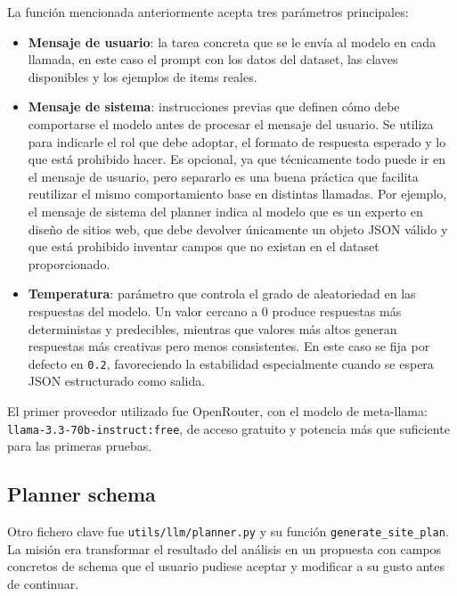 La función mencionada anteriormente acepta tres parámetros principales:

\begin{itemize}
    \item \textbf{Mensaje de usuario}: la tarea concreta que se le envía al modelo 
    en cada llamada, en este caso el prompt con los datos del dataset, las claves 
    disponibles y los ejemplos de items reales.
    
    \item \textbf{Mensaje de sistema}: instrucciones previas que definen cómo debe 
    comportarse el modelo antes de procesar el mensaje del usuario. Se utiliza para 
    indicarle el rol que debe adoptar, el formato de respuesta esperado y lo que 
    está prohibido hacer. Es opcional, ya que técnicamente todo puede ir en el 
    mensaje de usuario, pero separarlo es una buena práctica que facilita reutilizar 
    el mismo comportamiento base en distintas llamadas. Por ejemplo, el mensaje de sistema del planner indica al modelo que es un experto en diseño 
    de sitios web, que debe devolver únicamente un objeto JSON válido y que está 
    prohibido inventar campos que no existan en el dataset proporcionado.
    
    \item \textbf{Temperatura}: parámetro que controla el grado de aleatoriedad 
    en las respuestas del modelo. Un valor cercano a 0 produce respuestas más 
    deterministas y predecibles, mientras que valores más altos generan respuestas 
    más creativas pero menos consistentes. En este caso se fija por defecto en 
    \texttt{0.2}, favoreciendo la estabilidad especialmente cuando se espera JSON 
    estructurado como salida.
\end{itemize}

El primer proveedor utilizado fue OpenRouter, con el modelo de meta-llama: \\
\texttt{llama-3.3-70b-instruct:free}, de acceso gratuito y potencia más que suficiente para las primeras pruebas.


\subsection{Planner schema}
\label{subsec:planner-schema}

Otro fichero clave fue \texttt{utils/llm/planner.py} y su función \texttt{generate\_site\_plan}. La misión era transformar el resultado del análisis en un propuesta con campos
concretos de schema que el usuario pudiese aceptar y modificar a su gusto antes de continuar.

